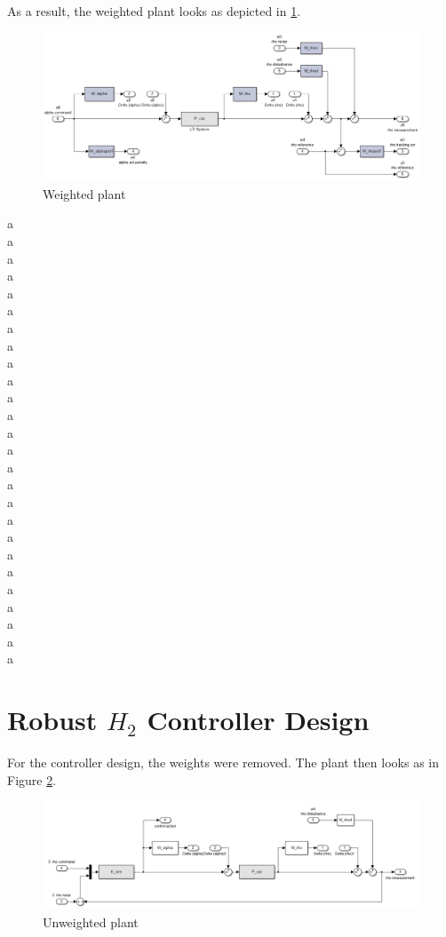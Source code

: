 \documentclass[conference]{IEEEtran}
\begin{document}
As a result, the weighted plant looks as depicted in \ref{figure:model_car}.

\begin{figure}[h]
\centering
  \includegraphics[width=.47\textwidth]{pics/model_car.png} 
  \caption{Weighted plant}  
  \label{figure:model_car}
\end{figure}

a \\
a \\
a \\
a \\
a \\
a \\
a \\
a \\
a \\
a \\
a \\
a \\
a \\
a \\
a \\
a \\
a \\
a \\
a \\
a \\
a \\
a \\
a \\
a \\
a \\
a \\


\section{Robust $H_{2}$ Controller Design}

For the controller design, the weights were removed. The plant then looks as in Figure \ref{figure:arab_driving}.

\begin{figure}[h]
\centering
  \includegraphics[width=.47\textwidth]{pics/model_car_unweighted.png} 
  \caption{Unweighted plant}  
  \label{figure:arab_driving}
\end{figure}
\end{document}
